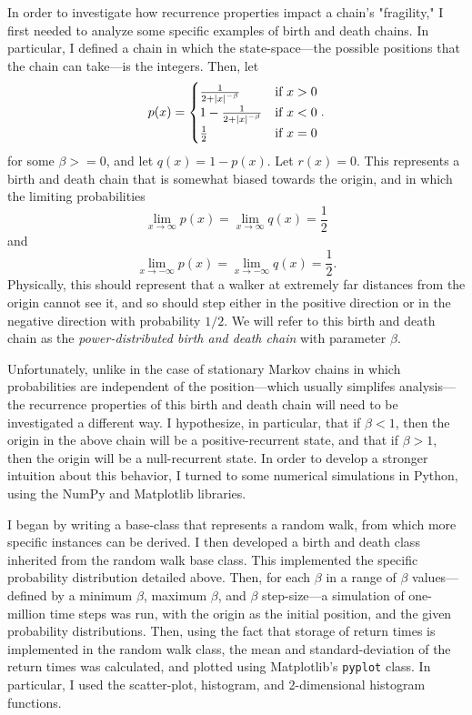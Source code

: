 In order to investigate how recurrence properties impact a chain's "fragility," I first needed to
analyze some specific examples of birth and death chains. In particular, I defined a chain in which the
state-space---the possible positions that the chain can take---is the integers. Then, let
\[
    p(x) = \begin{cases}
        \frac{1}{2+\left\vert x \right\vert^{-\beta}} & \text{if } x > 0 \\
        1 - \frac{1}{2+\left\vert x \right\vert^{-\beta}} & \text{if } x < 0 \\
        \frac{1}{2} & \text{if } x = 0
    \end{cases}.
\]
for some $\beta >= 0$, and let $q(x) = 1 - p(x)$. Let $r(x) = 0$. This represents a birth and death
chain that is somewhat biased towards the origin, and in which the limiting probabilities
\[
    \lim_{x \to \infty} p(x) = \lim_{x \to \infty} q(x) = \frac{1}{2}  
\]
and
\[
    \lim_{x \to -\infty} p(x) = \lim_{x \to -\infty} q(x) = \frac{1}{2}.  
\]
Physically, this should represent that a walker at extremely far distances from the origin cannot see
it, and so should step either in the positive direction or in the negative direction with probability
$1/2$. We will refer to this birth and death chain as the \emph{power-distributed birth and death
chain} with parameter $\beta$.

Unfortunately, unlike in the case of stationary Markov chains in which probabilities are independent of
the position---which usually simplifes analysis---the recurrence properties of this birth and death
chain will need to be investigated a different way. I hypothesize, in particular, that if $\beta < 1$,
then the origin in the above chain will be a positive-recurrent state, and that if $\beta > 1$, then the
origin will be a null-recurrent state. In order to develop a stronger intuition about this behavior, I
turned to some numerical simulations in Python, using the NumPy and Matplotlib libraries.

I began by writing a base-class that represents a random walk, from which more specific instances can be
derived. I then developed a birth and death class inherited from the random walk base class. This
implemented the specific probability distribution detailed above. Then, for each $\beta$ in a range of
$\beta$ values---defined by a minimum $\beta$, maximum $\beta$, and $\beta$ step-size---a simulation of
one-million time steps was run, with the origin as the initial position, and the given probability
distributions. Then, using the fact that storage of return times is implemented in the random walk
class, the mean and standard-deviation of the return times was calculated, and plotted using
Matplotlib's \texttt{pyplot} class. In particular, I used the scatter-plot, histogram, and
2-dimensional histogram functions.


